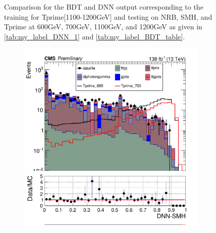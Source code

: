 \begin{figure}[H]
\begin{subfigure}[b]{0.47\textwidth}
         \label{fig:three sin x}
     \end{subfigure}
    \hfill
     \label{fig:Comaprision_3}
     \caption{Comparison for the BDT and DNN output corresponding to the training for Tprime[1100-1200GeV] and testing on NRB, SMH, and Tprime at 600GeV, 700GeV, 1100GeV, and 1200GeV as given in \autoref{tab:my_label_DNN_1} and \autoref{tab:my_label_BDT_table}.}
\end{figure}



\begin{figure}[H]
     \centering
     \begin{subfigure}[b]{0.47\textwidth}
         \centering
         \includegraphics[width=\textwidth]{figure_4/Stacked_plot_DNN_600-700_with_diphoton_cuts_Scaled_inputs.pdf}
         \label{fig:y equals x}
     \end{subfigure}
     \hfill
     \begin{subfigure}[b]{0.47\textwidth}
         \centering

\end{subfigure}
\end{figure}
